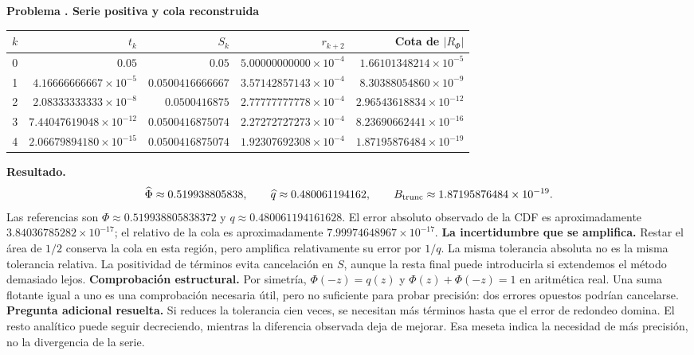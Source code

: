 \documentclass[11pt,a4paper]{article}
\theoremstyle{definition}
\newcounter{problema}
\newenvironment{resuelto}[1]{\refstepcounter{problema}\par\medskip\Needspace{6\baselineskip}\textbf{Problema \theproblema. #1}\par}{\par\medskip}
\begin{document}
\begin{resuelto}{Serie positiva y cola reconstruida}
\begin{center}\small\begin{tabular}{rrrrr}
\toprule
$k$&$t_k$&$S_k$&$r_{k+2}$&Cota de $|R_\Phi|$\\
\midrule
0&$0.05$&$0.05$&$5.00000000000\times10^{-4}$&$1.66101348214\times10^{-5}$\\
1&$4.16666666667\times10^{-5}$&$0.0500416666667$&$3.57142857143\times10^{-4}$&$8.30388054860\times10^{-9}$\\
2&$2.08333333333\times10^{-8}$&$0.0500416875$&$2.77777777778\times10^{-4}$&$2.96543618834\times10^{-12}$\\
3&$7.44047619048\times10^{-12}$&$0.0500416875074$&$2.27272727273\times10^{-4}$&$8.23690662441\times10^{-16}$\\
4&$2.06679894180\times10^{-15}$&$0.0500416875074$&$1.92307692308\times10^{-4}$&$1.87195876484\times10^{-19}$\\
\bottomrule\end{tabular}\end{center}
\textbf{Resultado.}
\[
\widehat\Phi\approx0.519938805838,\qquad \widehat q\approx0.480061194162,\qquad B_{\rm trunc}\approx1.87195876484\times10^{-19}.
\]
Las referencias son $\Phi\approx0.519938805838372$ y $q\approx0.480061194161628$. El error absoluto observado de la CDF es aproximadamente $3.84036785282\times10^{-17}$; el relativo de la cola es aproximadamente $7.99974648967\times10^{-17}$.
\textbf{La incertidumbre que se amplifica.} Restar el área de $1/2$ conserva la cola en esta región, pero amplifica relativamente su error por $1/q$. La misma tolerancia absoluta no es la misma tolerancia relativa. La positividad de términos evita cancelación en $S$, aunque la resta final puede introducirla si extendemos el método demasiado lejos.
\textbf{Comprobación estructural.} Por simetría, $\Phi(-z)=q(z)$ y $\Phi(z)+\Phi(-z)=1$ en aritmética real. Una suma flotante igual a uno es una comprobación necesaria útil, pero no suficiente para probar precisión: dos errores opuestos podrían cancelarse.
\textbf{Pregunta adicional resuelta.} Si reduces la tolerancia cien veces, se necesitan más términos hasta que el error de redondeo domina. El resto analítico puede seguir decreciendo, mientras la diferencia observada deja de mejorar. Esa meseta indica la necesidad de más precisión, no la divergencia de la serie.
\end{resuelto}
\end{document}

